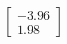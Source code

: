 \documentclass[preview]{standalone}
\begin{document}
\begin{align*}
\begin{bmatrix} -3.96 \\ 1.98 \end{bmatrix}
\end{align*}
\end{document}
